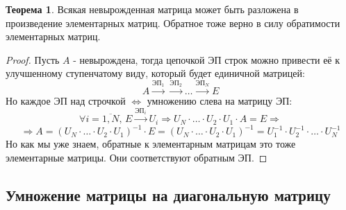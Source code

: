 \documentclass[12pt]{article}
\theoremstyle{definition}
\newtheorem{theorem}{Теорема}
\begin{document}
\newpage
\begin{theorem}
	Всякая невырожденная матрица может быть разложена в произведение элементарных матриц. Обратное тоже верно в силу обратимости элементарных матриц.
\end{theorem}
\begin{proof}
	Пусть $A$ - невырождена, тогда цепочкой ЭП строк можно привести её к улучшенному ступенчатому виду, который будет единичной матрицей: 
	$$
		A \xrightarrow{\text{ЭП}_1}\xrightarrow{\text{ЭП}_2}\dotsc \xrightarrow{\text{ЭП}_N}E
	$$
	Но каждое ЭП над строчкой $\Leftrightarrow$ умножению слева на матрицу ЭП:
	$$
		\forall i = \overline{1,N}, \, E\xrightarrow{\text{ЭП}_i}U_i \Rightarrow U_{N}{\cdot}\dotsc {\cdot}U_2{\cdot}U_1{\cdot}A = E \Rightarrow 
	$$
	$$
		\Rightarrow A = (U_{N}{\cdot}\dotsc {\cdot}U_2{\cdot}U_1)^{-1}{\cdot}E = (U_{N}{\cdot}\dotsc {\cdot}U_2{\cdot}U_1)^{-1} = U_1^{-1}{\cdot}U_2^{-1}{\cdot} \dotsc{\cdot}U_N^{-1}
	$$
	Но как мы уже знаем, обратные к элементарным матрицам это тоже элементарные матрицы. Они соответствуют обратным ЭП.
\end{proof}


\subsection*{Умножение матрицы на диагональную матрицу}
\end{document}
